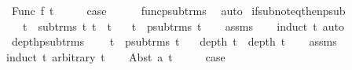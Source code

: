 \begin{isabellebody}
\ {\isacharparenleft}{\kern0pt}Func\ f\ t{\isacharparenright}{\kern0pt}\isanewline
\ \ \isamarkupfalse%
\ \isamarkupfalse%
\ {\isacharquery}{\kern0pt}case\isanewline
\ \ \ \ \isamarkupfalse%
\ func{\isacharunderscore}{\kern0pt}psub{\isacharunderscore}{\kern0pt}trms\ \isamarkupfalse%
\ auto\isanewline
{}\isamarkupfalse%
%
\endisatagproof
{\isafoldproof}%
%
\isadelimproof
\isanewline
%
\endisadelimproof
\isanewline
{}\isamarkupfalse%
\ if{\isacharunderscore}{\kern0pt}sub{\isacharunderscore}{\kern0pt}not{\isacharunderscore}{\kern0pt}eq{\isacharunderscore}{\kern0pt}then{\isacharunderscore}{\kern0pt}psub{\isacharcolon}{\kern0pt}\ \isanewline
\ \ \ {\isachardoublequoteopen}t{}\ {\isasymin}\ sub{\isacharunderscore}{\kern0pt}trms\ t{}{\isachardoublequoteclose}\ {\isachardoublequoteopen}t{}\ {\isasymnoteq}\ t{}{\isachardoublequoteclose}\isanewline
\ \ \ {\isachardoublequoteopen}t{}\ {\isasymin}\ psub{\isacharunderscore}{\kern0pt}trms\ t{}{\isachardoublequoteclose}\isanewline
%
\isadelimproof
\ \ %
\endisadelimproof
%
\isatagproof
{}\isamarkupfalse%
\ assms\isanewline
\ \ \isamarkupfalse%
\ {\isacharparenleft}{\kern0pt}induct\ t{}{\isacharparenright}{\kern0pt}\ auto%
\endisatagproof
{\isafoldproof}%
%
\isadelimproof
\isanewline
%
\endisadelimproof
\isanewline
{}\isamarkupfalse%
\ depth{\isacharunderscore}{\kern0pt}psub{\isacharunderscore}{\kern0pt}trms{\isacharcolon}{\kern0pt}\ \isanewline
\ \ \ {\isachardoublequoteopen}t{}\ {\isasymin}\ psub{\isacharunderscore}{\kern0pt}trms\ t{}{\isachardoublequoteclose}\isanewline
\ \ \ {\isachardoublequoteopen}depth\ t{}\ {\isacharless}{\kern0pt}\ depth\ t{}{\isachardoublequoteclose}\isanewline
%
\isadelimproof
\ \ %
\endisadelimproof
%
\isatagproof
{}\isamarkupfalse%
\ assms\isanewline
{}\isamarkupfalse%
{\isacharparenleft}{\kern0pt}induct\ t{}\ arbitrary{\isacharcolon}{\kern0pt}\ t{}{\isacharparenright}{\kern0pt}\isanewline
\ \ \isamarkupfalse%
\ {\isacharparenleft}{\kern0pt}Abst\ a\ t{\isacharparenright}{\kern0pt}\isanewline
\ \ \isamarkupfalse%
\ \isamarkupfalse%
\ {\isacharquery}{\kern0pt}case\isanewline
\ \ \ \ \isamarkupfalse%

\end{isabellebody}

